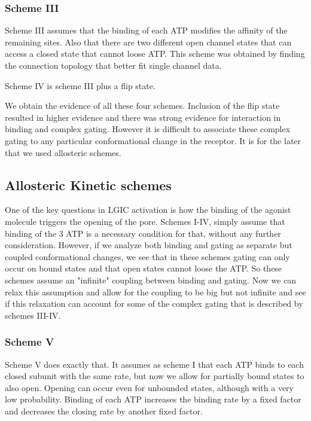 \documentclass[pdflatex,sn-mathphys-num]{sn-jnl}%
\theoremstyle{thmstyleone}%
\theoremstyle{thmstyletwo}%
\theoremstyle{thmstylethree}%
\begin{document}
\subsubsection{Scheme III} \label{scheme I}
Scheme III assumes that the binding of each ATP modifies the affinity of the remaining sites. Also that there are two different open channel states that can access a closed state that cannot loose ATP. This scheme was obtained by finding the connection topology that better fit single channel data. 

Scheme IV is scheme III plus a flip state. 

We obtain the evidence of all these four schemes. Inclusion of the flip state resulted in higher evidence and there was strong evidence for interaction in binding and complex gating. 
However it is difficult to associate these complex gating to any particular conformational change in the receptor. It is for the later that we used allosteric schemes. 

\subsection{Allosteric Kinetic schemes}
\label{subsec2}

One of the key questions in LGIC activation is how the binding of the agonist molecule triggers the opening of the pore. Schemes I-IV, simply assume that binding of the 3 ATP is a necessary condition for that, without any further consideration. 
However, if we analyze both binding and gating as separate but coupled conformational changes, we see that in these schemes gating can only occur on bound states and that open states cannot loose the ATP. So these schemes assume an "infinite" coupling between binding and gating. Now we can relax this assumption and allow for the coupling to be big but not infinite and see if this relaxation can account for some of the complex gating that is described by schemes III-IV. 

\subsubsection{Scheme V} 
\label{scheme V}
Scheme V does exactly that. It assumes as scheme I that each ATP binds to each closed subunit with the same rate, but now we allow for partially bound states to also open. Opening can occur even for unbounded states, although with a very low probability. Binding of each ATP increases the binding rate by a fixed factor and decreases the closing rate by another fixed factor. 
\end{document}
